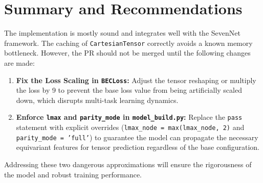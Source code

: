 \documentclass[12pt]{article}
\begin{document}
\section{Summary and Recommendations}
The implementation is mostly sound and integrates well with the SevenNet framework. The caching of \texttt{CartesianTensor} correctly avoids a known memory bottleneck. However, the PR should not be merged until the following changes are made:
\begin{enumerate}[label=\arabic*.]
    \item \textbf{Fix the Loss Scaling in \texttt{BECLoss}:} Adjust the tensor reshaping or multiply the loss by 9 to prevent the base loss value from being artificially scaled down, which disrupts multi-task learning dynamics.
    \item \textbf{Enforce \texttt{lmax} and \texttt{parity\_mode} in \texttt{model\_build.py}:} Replace the \texttt{pass} statement with explicit overrides (\texttt{lmax\_node = max(lmax\_node, 2)} and \texttt{parity\_mode = 'full'}) to guarantee the model can propagate the necessary equivariant features for tensor prediction regardless of the base configuration.
\end{enumerate}

Addressing these two dangerous approximations will ensure the rigorousness of the model and robust training performance.
\end{document}
